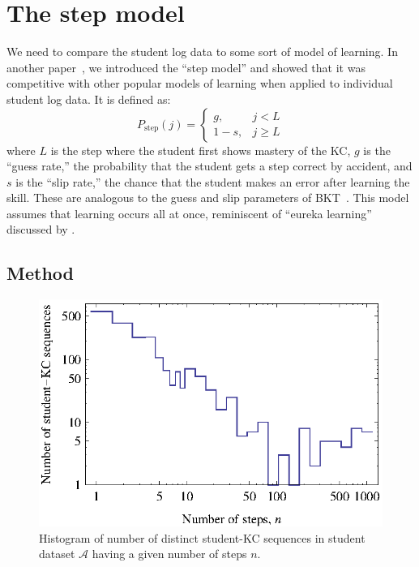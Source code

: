 \documentclass{edm_template}
\begin{document}
\section{The step model}


We need to compare the student log data to some sort of model
of learning.  In another paper~\cite{van_de_sande_applying_2013},
we introduced the ``step model'' and showed that it was 
competitive with other popular models of learning when applied
to individual student log data.  It is defined as:
%
\begin{equation}
    P_\mathrm{step}(j)= \left\{\begin{array}{cc}
                 g, & j<L \\
                 1-s, & j\ge L 
                 \end{array} \right. 
\end{equation}
%
where $L$ is the step where the student first shows mastery of the KC,
$g$ is the ``guess rate,'' the probability that the student gets a
step correct by accident, and $s$ is the ``slip rate,'' the chance
that the student makes an error after learning the skill.  These are
analogous to the guess and slip parameters of
BKT~\cite{corbett_knowledge_1995}.  This model assumes that learning 
occurs all at once, reminiscent of ``eureka learning''
discussed by \cite{baker_detecting_2011}.

\subsection{Method}


\begin{figure}
  \centering \includegraphics{student-kc-length-histogram.eps}
  \caption{Histogram of number of distinct student-KC sequences in student 
    dataset $\mathcal{A}$ having a given number of steps $n$.}
    \label{student-length-histogram}
\end{figure}
\end{document}
